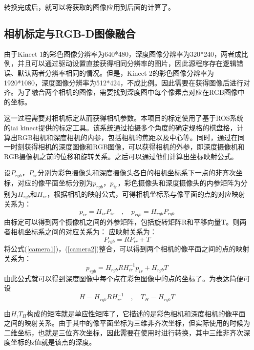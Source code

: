 转换完成后，就可以将获取的图像应用到后面的计算了。

\subsection{相机标定与RGB-D图像融合}
由于Kinect 1的彩色图像分辨率为640*480，深度图像分辨率为320*240，两者成比例，并且可以通过驱动设置直接获得相同分辨率的图片，因此源程序存在逻辑错误、默认两者分辨率相同的情况。但是，Kinect 2的彩色图像分辨率为1920*1080，深度图像分辨率为512*424，不成比例。因此需要在获得图像后进行对齐。为了融合两个相机的图像，需要找到深度图中每个像素点对应在RGB图像中的坐标。

这一过程需要对相机标定从而获得相机参数。本项目的标定使用了基于ROS系统的iai kinect提供的标定工具\cite{iai_kinect2}。该系统通过拍摄多个角度的确定规格的棋盘格，计算出RGB相机和深度相机的内参，包括相机的焦距以及中心等。同时，通过在同一时刻获得相机的深度图像和RGB图像，可以获得相机的外参，即深度摄像机和RGB摄像机之前的位移和旋转关系。之后可以通过他们计算出坐标映射公式。

设$P_{rgb}$，$P_{ir}$分别为彩色摄像头和深度摄像头各自的相机坐标系下一点的非齐次坐标，对应的像平面坐标分别为$p_{rgb}$，$p_{ir}$，彩色摄像头和深度摄像头的内参矩阵为分别为$H_{rgb}$和$H_{ir}$，根据相机的映射公式，可得相机坐标系与像平面的点的对应映射关系为：
\begin{equation}
 p_{ir} = H_{ir}P_{ir} \quad\mathrm{,}\quad  p_{rgb} = H_{rgb}P_{rgb}\label{camera1}
\end{equation}
由标定可以得到两个摄像机之间的外参矩阵，包括旋转矩阵R和平移向量T。则两者相机坐标系之间的对应关系为：
应映射关系为：
\begin{equation}
 P_{rgb} = RP_{ir} + T \label{camera2}
\end{equation}
将公式(\ref{camera1})，(\ref{camera2})整合，可以得到两个相机的像平面之间的点的映射关系为：
\begin{equation}
 p_{rgb} = H_{rgb}RH_{ir}^{-1}p_{ir} + H_{rgb}T
\end{equation}
由此公式就可以得到深度图像中每个点在彩色图像中的点的坐标了。为表达简便可设
\begin{equation}
 H = H_{rgb}RH_{ir}^{-1} \quad\mathrm{,}\quad T_H = H_{rgb}T
\end{equation}

由$H$,$T_H$构成的矩阵就是单应性矩阵了，它描述的是彩色相机和深度相机的像平面之间的映射关系。由于其中的像平面坐标为三维非齐次坐标，但实际使用的时候为二维坐标，也就是三位齐次坐标，因此需要在使用时进行转换，其中三维非齐次深度坐标的z值就是该点的深度。
	
